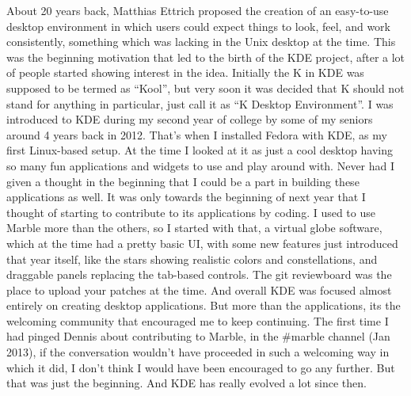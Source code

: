 


\noindent{}About 20 years back, Matthias Ettrich proposed the creation of an easy-to-use desktop environment in which users could expect things to look, feel, and work consistently, something which was lacking in the Unix desktop at the time. This was the beginning motivation that led to the birth of the KDE project, after a lot of people started showing interest in the idea. Initially the K in KDE was supposed to be termed as “Kool”, but very soon it was decided that K should not stand for anything in particular, just call it as “K Desktop Environment”. I was introduced to KDE during my second year of college by some of my seniors around 4 years back in 2012. That's when I installed Fedora with KDE, as my first Linux-based setup. At the time I looked at it as just a cool desktop having so many fun applications and widgets to use and play around with. Never had I given a thought in the beginning that I could be a part in building these applications as well. It was only towards the beginning of next year that I thought of starting to contribute to its applications by coding. I used to use Marble more than the others, so I started with that, a virtual globe software, which at the time had a pretty basic UI, with some new features just introduced that year itself, like the stars showing realistic colors and constellations, and draggable panels replacing the tab-based controls. The git reviewboard was the place to upload your patches at the time. And overall KDE was focused almost entirely on creating desktop applications. But more than the applications, its the welcoming community that encouraged me to keep continuing. The first time I had pinged Dennis about contributing to Marble, in the \#marble channel (Jan 2013), if the conversation wouldn't have proceeded in such a welcoming way in which it did, I don't think I would have been encouraged to go any further. But that was just the beginning. And KDE has really evolved a lot since then.

